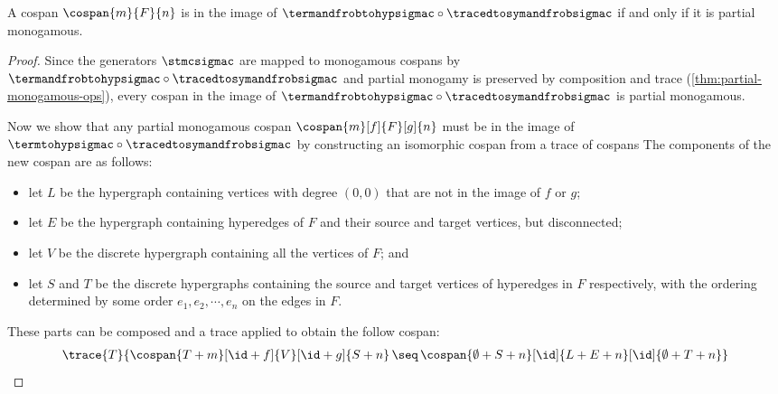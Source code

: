 \begin{theorem}\label{thm:termtohyp-image}
    A cospan \(\cospan{m}{F}{n}\) is in the image of \(
        \termandfrobtohypsigmac \circ \tracedtosymandfrobsigmac\) if
    and only if it is partial monogamous.
\end{theorem}
\begin{proof}
    Since the generators \(\stmcsigmac\) are mapped to monogamous cospans
    by \(\termandfrobtohypsigmac \circ \tracedtosymandfrobsigmac\) and partial
    monogamy is preserved by composition and trace
    (\cref{thm:partial-monogamous-ops}), every cospan in the image of
    \(\termandfrobtohypsigmac \circ \tracedtosymandfrobsigmac\) is partial
    monogamous.

    Now we show that any partial monogamous cospan \(
        \cospan{m}[f]{F}[g]{n}
    \) must be in the image of \(
        \termtohypsigmac \circ \tracedtosymandfrobsigmac
    \) by constructing an isomorphic cospan from a trace of cospans
    The components of the new cospan are as follows:
    \begin{itemize}
        \item let \(L\) be the hypergraph containing vertices with degree
                \((0,0)\) that are not in the image of \(f\) or \(g\);
        \item let \(E\) be the hypergraph containing hyperedges of \(F\) and
                their source and target vertices, but disconnected;
        \item let \(V\) be the discrete hypergraph containing all the
                vertices of \(F\); and
        \item let \(S\) and \(T\) be the discrete hypergraphs containing
                the source and target vertices of hyperedges in \(F\)
                respectively, with the ordering determined by some order
                \(e_1,e_2,\cdots,e_n\) on the edges in \(F\).
    \end{itemize}

    These parts can be composed and a trace applied to obtain the follow
    cospan:
    \begin{gather}
        \trace{T}{
            \cospan{T + m}[\id + f]{V}[\id + g]{S + n}
            \,\seq\,
            \cospan{\emptyset + S + n}[\id]{L + E + n}[\id]{\emptyset + T + n}
        }
        \label{gat:cospan}
    \end{gather}


\end{proof}
